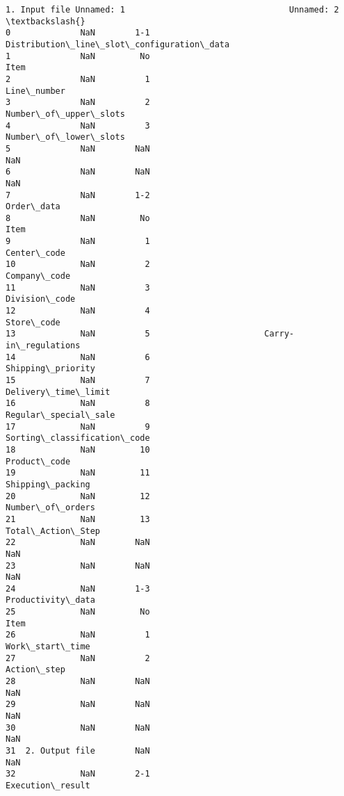 \documentclass[11pt]{article}
\begin{document}
    \begin{Verbatim}[commandchars=\\\{\}]
     1. Input file Unnamed: 1                                 Unnamed: 2  \textbackslash{}
0              NaN        1-1  Distribution\_line\_slot\_configuration\_data
1              NaN         No                                       Item
2              NaN          1                                Line\_number
3              NaN          2                      Number\_of\_upper\_slots
4              NaN          3                      Number\_of\_lower\_slots
5              NaN        NaN                                        NaN
6              NaN        NaN                                        NaN
7              NaN        1-2                                 Order\_data
8              NaN         No                                       Item
9              NaN          1                                Center\_code
10             NaN          2                               Company\_code
11             NaN          3                              Division\_code
12             NaN          4                                 Store\_code
13             NaN          5                       Carry-in\_regulations
14             NaN          6                          Shipping\_priority
15             NaN          7                        Delivery\_time\_limit
16             NaN          8                       Regular\_special\_sale
17             NaN          9                Sorting\_classification\_code
18             NaN         10                               Product\_code
19             NaN         11                           Shipping\_packing
20             NaN         12                           Number\_of\_orders
21             NaN         13                          Total\_Action\_Step
22             NaN        NaN                                        NaN
23             NaN        NaN                                        NaN
24             NaN        1-3                          Productivity\_data
25             NaN         No                                       Item
26             NaN          1                            Work\_start\_time
27             NaN          2                                Action\_step
28             NaN        NaN                                        NaN
29             NaN        NaN                                        NaN
30             NaN        NaN                                        NaN
31  2. Output file        NaN                                        NaN
32             NaN        2-1                           Execution\_result

\end{Verbatim}
\end{document}

